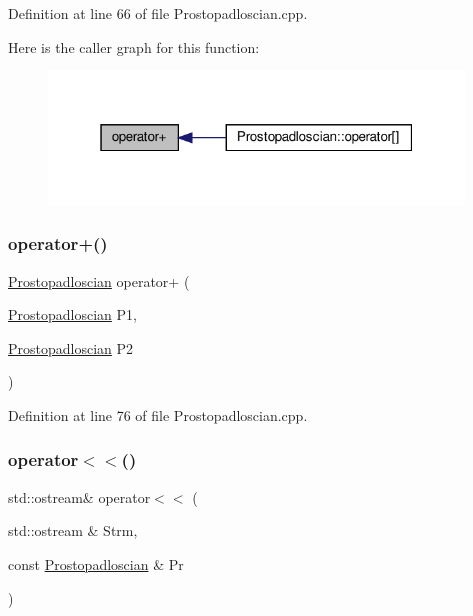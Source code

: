 Definition at line 66 of file Prostopadloscian.\+cpp.

Here is the caller graph for this function\+:\nopagebreak
\begin{figure}[H]
\begin{center}
\leavevmode
\includegraphics[width=313pt]{_prostopadloscian_8hh_aed7fb32f55c347f1ffbbdb209d41fa04_icgraph}
\end{center}
\end{figure}
\mbox{\label{_prostopadloscian_8hh_ae86d86b37f5a8a4fb819b121ef0473d5}} 
\subsubsection{\texorpdfstring{operator+()}{operator+()}\hspace{0.1cm}{\footnotesize\ttfamily [2/2]}}
{\footnotesize\ttfamily \hyperlink{class_prostopadloscian}{Prostopadloscian} operator+ (\begin{DoxyParamCaption}\item[{\hyperlink{class_prostopadloscian}{Prostopadloscian}}]{P1,  }\item[{\hyperlink{class_prostopadloscian}{Prostopadloscian}}]{P2 }\end{DoxyParamCaption})}



Definition at line 76 of file Prostopadloscian.\+cpp.

\mbox{\label{_prostopadloscian_8hh_a0a77f9bb1cc3f07e11031b947e6e7322}} 
\subsubsection{\texorpdfstring{operator$<$$<$()}{operator<<()}}
{\footnotesize\ttfamily std\+::ostream\& operator$<$$<$ (\begin{DoxyParamCaption}\item[{std\+::ostream \&}]{Strm,  }\item[{const \hyperlink{class_prostopadloscian}{Prostopadloscian} \&}]{Pr }\end{DoxyParamCaption})}



